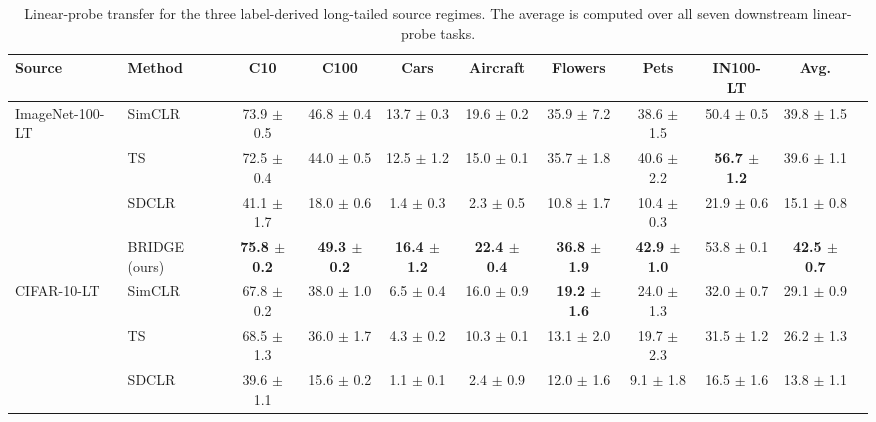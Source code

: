 \begin{table}[t]
\centering
\tiny
\setlength{\tabcolsep}{3.0pt}
\caption{Linear-probe transfer for the three label-derived long-tailed source regimes. The average is computed over all seven downstream linear-probe tasks.}
\label{tab:main_sota_label_sources}
\begin{adjustbox}{max width=\textwidth}
\begin{tabular}{l l c c c c c c c c c}
\toprule
Source & Method & C10 & C100 & Cars & Aircraft & Flowers & Pets & IN100-LT & Avg. \\
\midrule
ImageNet-100-LT & SimCLR & 73.9 {\scriptsize$\pm$ 0.5} & 46.8 {\scriptsize$\pm$ 0.4} & 13.7 {\scriptsize$\pm$ 0.3} & 19.6 {\scriptsize$\pm$ 0.2} & 35.9 {\scriptsize$\pm$ 7.2} & 38.6 {\scriptsize$\pm$ 1.5} & 50.4 {\scriptsize$\pm$ 0.5} & 39.8 {\scriptsize$\pm$ 1.5} \\
 & TS & 72.5 {\scriptsize$\pm$ 0.4} & 44.0 {\scriptsize$\pm$ 0.5} & 12.5 {\scriptsize$\pm$ 1.2} & 15.0 {\scriptsize$\pm$ 0.1} & 35.7 {\scriptsize$\pm$ 1.8} & 40.6 {\scriptsize$\pm$ 2.2} & \textbf{56.7 {\scriptsize$\pm$ 1.2}} & 39.6 {\scriptsize$\pm$ 1.1} \\
 & SDCLR & 41.1 {\scriptsize$\pm$ 1.7} & 18.0 {\scriptsize$\pm$ 0.6} & 1.4 {\scriptsize$\pm$ 0.3} & 2.3 {\scriptsize$\pm$ 0.5} & 10.8 {\scriptsize$\pm$ 1.7} & 10.4 {\scriptsize$\pm$ 0.3} & 21.9 {\scriptsize$\pm$ 0.6} & 15.1 {\scriptsize$\pm$ 0.8} \\
\rowcolor{blue!10}  & BRIDGE (ours) & \textbf{75.8 {\scriptsize$\pm$ 0.2}} & \textbf{49.3 {\scriptsize$\pm$ 0.2}} & \textbf{16.4 {\scriptsize$\pm$ 1.2}} & \textbf{22.4 {\scriptsize$\pm$ 0.4}} & \textbf{36.8 {\scriptsize$\pm$ 1.9}} & \textbf{42.9 {\scriptsize$\pm$ 1.0}} & 53.8 {\scriptsize$\pm$ 0.1} & \textbf{42.5 {\scriptsize$\pm$ 0.7}} \\
\midrule
CIFAR-10-LT & SimCLR & 67.8 {\scriptsize$\pm$ 0.2} & 38.0 {\scriptsize$\pm$ 1.0} & 6.5 {\scriptsize$\pm$ 0.4} & 16.0 {\scriptsize$\pm$ 0.9} & \textbf{19.2 {\scriptsize$\pm$ 1.6}} & 24.0 {\scriptsize$\pm$ 1.3} & 32.0 {\scriptsize$\pm$ 0.7} & 29.1 {\scriptsize$\pm$ 0.9} \\
 & TS & 68.5 {\scriptsize$\pm$ 1.3} & 36.0 {\scriptsize$\pm$ 1.7} & 4.3 {\scriptsize$\pm$ 0.2} & 10.3 {\scriptsize$\pm$ 0.1} & 13.1 {\scriptsize$\pm$ 2.0} & 19.7 {\scriptsize$\pm$ 2.3} & 31.5 {\scriptsize$\pm$ 1.2} & 26.2 {\scriptsize$\pm$ 1.3} \\
 & SDCLR & 39.6 {\scriptsize$\pm$ 1.1} & 15.6 {\scriptsize$\pm$ 0.2} & 1.1 {\scriptsize$\pm$ 0.1} & 2.4 {\scriptsize$\pm$ 0.9} & 12.0 {\scriptsize$\pm$ 1.6} & 9.1 {\scriptsize$\pm$ 1.8} & 16.5 {\scriptsize$\pm$ 1.6} & 13.8 {\scriptsize$\pm$ 1.1} \\

\end{tabular}
\end{adjustbox}
\end{table}
